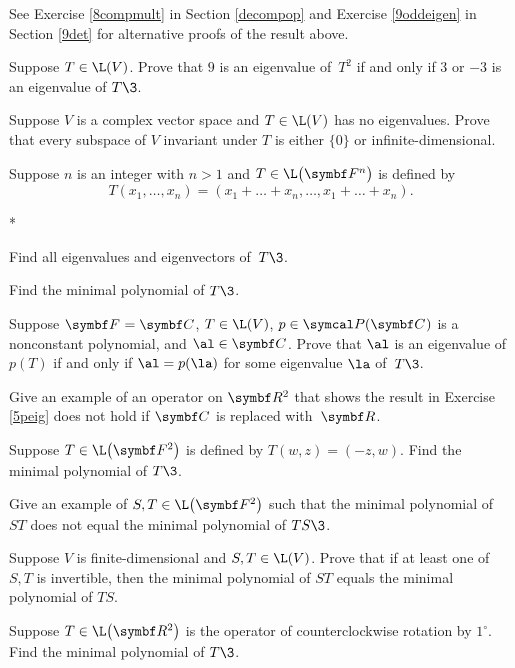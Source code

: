 See Exercise \ref{8compmult} in Section \ref{decompop} and Exercise \ref{9oddeigen} in Section \ref{9det} for alternative proofs of the result above.
\
\begin{exercises}

\exercise
Suppose $T \in \L(V)$.  Prove that $9$ is an
eigenvalue of~$T^2$ if and only if $3$ or $-3$ is an eigenvalue of $T\3$.


\exercise
Suppose $V$ is a complex vector space and $T \in \L(V)$ has no eigenvalues. Prove
that every subspace of $V$ invariant under $T$ is either $\{0\}$ or infinite-dimensional.


\exercise
Suppose $n$ is an integer with $n>1$ and $T \in \L\paren[\big]{\F{n}}$ is defined by
\[
T(x_1, \dots, x_n) = (x_1 + \dots + x_n, \dots, x_1 + \dots + x_n).
\]
\begin{subtheorem}*
\item
Find all eigenvalues and eigenvectors of~$T\3$.
\item
Find the minimal polynomial of $T\3$.
\end{subtheorem}


\exercise
Suppose $\F{} = \C{}$, $T \in \L(V)$, $p \in \P(\C{})$ is a nonconstant polynomial,
and $\al \in \C{}$.  Prove that $\al$ is an eigenvalue of $p(T)$ if and only if
$\al = p(\la)$ for some eigenvalue $\la$ of~$T\3$.\label{5peig}


\exercise
Give an example of an operator on $\R2$ that shows the result in Exercise \ref{5peig} does not hold if $\C{}$ is replaced with~$\R{}$.


\exercise
Suppose $T \in \L\paren[\big]{\F2}$ is defined by $T(w, z) = (-z, w)$. Find the minimal polynomial of $T\3$.


\exercise
\begin{SUBtheorem}
\item
Give an example of $S, T \in \L\paren[\big]{\F2}$ such that the minimal polynomial of $ST$ does not equal the minimal polynomial of $TS\3$.
\item
Suppose $V$ is finite-dimensional and $S, T \in \L(V)$. Prove that if at least one of $S, T$  is invertible, then the minimal polynomial of $ST$ equals the minimal polynomial of $TS$.
\end{SUBtheorem}


\exercise
Suppose $T \in \L\paren[\big]{\R2}$ is the operator of counterclockwise rotation by $1^\circ$. Find the minimal polynomial of $T\3$.



\end{exercises}
